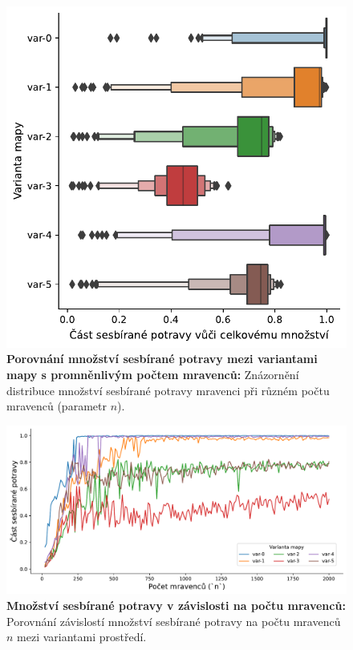 \documentclass[10pt,a4paper,twocolumn]{article}
\begin{document}
\begin{figure}[tb]
  \centering
  \includegraphics[width=0.98\linewidth]{images/num_ants_variants_means.pdf}
  \caption{\textbf{Porovnání množství sesbírané potravy mezi variantami mapy s promněnlivým počtem mravenců:}
  Znázornění distribuce množství sesbírané potravy mravenci 
  při různém počtu mravenců (parametr $n$).}
  \label{fig:num_ants_means}
\end{figure}

\begin{figure}[tb]
  \centering
  \includegraphics[width=0.98\linewidth]{images/num_ants_variants_together.pdf}
  \caption{\textbf{Množství sesbírané potravy v závislosti na počtu mravenců:}
  Porovnání závislostí množství sesbírané potravy na počtu 
  mravenců $n$ mezi variantami prostředí.}
  \label{fig:num_ants_together}
\end{figure}
\end{document}
